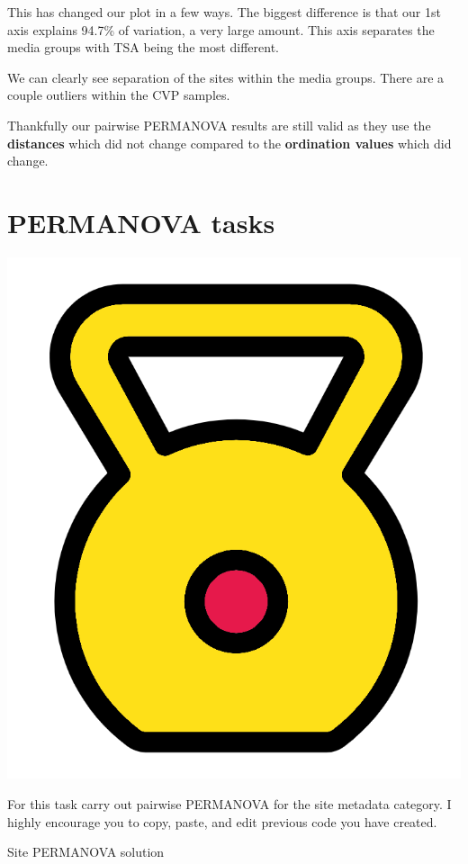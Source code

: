 \documentclass[
]{book}
\begin{document}
This has changed our plot in a few ways.
The biggest difference is that our 1st axis explains 94.7\% of variation, a very large amount.
This axis separates the media groups with TSA being the most different.

We can clearly see separation of the sites within the media groups.
There are a couple outliers within the CVP samples.

Thankfully our pairwise PERMANOVA results are still valid as they use the \textbf{distances} which did not change compared to the \textbf{ordination values} which did change.

\hypertarget{permanova-tasks}{%
\section{PERMANOVA tasks}\label{permanova-tasks}}

\includegraphics{figures/kettle_bell.png}

For this task carry out pairwise PERMANOVA for the site metadata category.
I highly encourage you to copy, paste, and edit previous code you have created.

Site PERMANOVA solution
\end{document}
